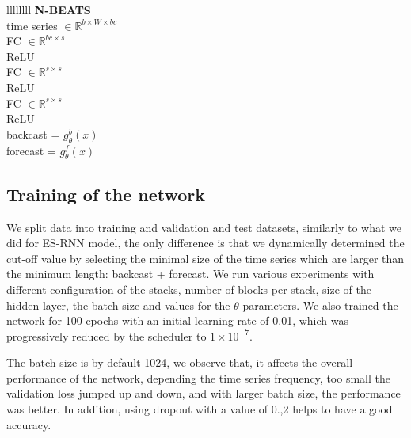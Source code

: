 \documentclass{article}
\begin{document}
\begin{table}[!ht]
	\centering
	\begin{tabular}{llllllll} 
		\midrule
			 {\textbf{N-BEATS}} \\
		\midrule
			 {time series $\in \mathbb{R}^{b \times W \times bc}$} \\
		\midrule
			 {FC  $\in \mathbb{R}^{bc \times s}$} \\		
		\midrule
			 {ReLU} \\		
		\midrule
			 {FC  $\in \mathbb{R}^{s \times s}$} \\		
		\midrule
			 {ReLU} \\		
		\midrule
			 {FC  $\in \mathbb{R}^{s \times s}$} \\		
		\midrule
			 {ReLU} \\		
		\midrule
			 {backcast = $g_\theta^b(x)$} \\		
			 {forecast = $g_\theta^f(x)$} \\		
		\midrule
	\end{tabular}
	\caption{N-BEATS architecture. Let $b$ the batch size, W is the number of input windows, bc backcast length, s is the size of the hidden layer.}
	\label{tab:nbeatsstack}
\end{table}

\subsection{Training of the network}
We split data into training and validation and test datasets, similarly to what we did for ES-RNN model, the only difference is that we dynamically determined the cut-off value by selecting the minimal size of the time series which
are larger than the minimum length: backcast + forecast. We run various experiments with different configuration of the stacks, number of blocks per stack, 
size of the hidden layer, the batch size and values  for the $\theta$ parameters.  We also trained the network for 100 epochs with an initial learning rate of 0.01,
 which was progressively reduced by the scheduler to $1 \times 10^{-7}$.

 The batch size is by default 1024, we observe that, it affects the overall performance of the network, depending the time series frequency,
 too small the validation loss jumped up and down, and with larger batch size, the performance was better.
 In addition, using dropout with a value of 0.,2 helps to have a good accuracy.
\end{document}
